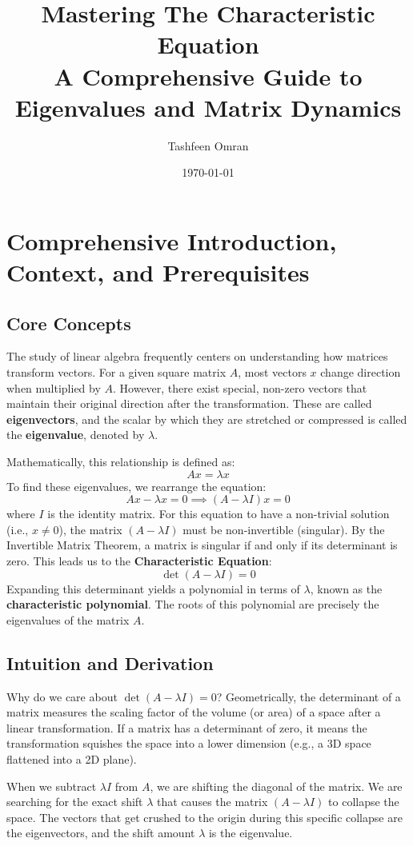 \documentclass[11pt, a4paper]{article}
\title{\textbf{Mastering The Characteristic Equation \\ \Large A Comprehensive Guide to Eigenvalues and Matrix Dynamics}}
\author{Tashfeen Omran}
\date{\today}
\theoremstyle{definition}
\theoremstyle{remark}
\begin{document}
\maketitle
\tableofcontents
\newpage

\section{Comprehensive Introduction, Context, and Prerequisites}

\subsection{Core Concepts}
The study of linear algebra frequently centers on understanding how matrices transform vectors. For a given square matrix $A$, most vectors $x$ change direction when multiplied by $A$. However, there exist special, non-zero vectors that maintain their original direction after the transformation. These are called \textbf{eigenvectors}, and the scalar by which they are stretched or compressed is called the \textbf{eigenvalue}, denoted by $\lambda$. 

Mathematically, this relationship is defined as:
\[ A x = \lambda x \]
To find these eigenvalues, we rearrange the equation:
\[ A x - \lambda x = 0 \implies (A - \lambda I)x = 0 \]
where $I$ is the identity matrix. For this equation to have a non-trivial solution (i.e., $x \neq 0$), the matrix $(A - \lambda I)$ must be non-invertible (singular). By the Invertible Matrix Theorem, a matrix is singular if and only if its determinant is zero. This leads us to the \textbf{Characteristic Equation}:
\[ \det(A - \lambda I) = 0 \]
Expanding this determinant yields a polynomial in terms of $\lambda$, known as the \textbf{characteristic polynomial}. The roots of this polynomial are precisely the eigenvalues of the matrix $A$.

\subsection{Intuition and Derivation}
Why do we care about $\det(A - \lambda I) = 0$? Geometrically, the determinant of a matrix measures the scaling factor of the volume (or area) of a space after a linear transformation. If a matrix has a determinant of zero, it means the transformation squishes the space into a lower dimension (e.g., a 3D space flattened into a 2D plane). 

When we subtract $\lambda I$ from $A$, we are shifting the diagonal of the matrix. We are searching for the exact shift $\lambda$ that causes the matrix $(A - \lambda I)$ to collapse the space. The vectors that get crushed to the origin during this specific collapse are the eigenvectors, and the shift amount $\lambda$ is the eigenvalue.
\end{document}

